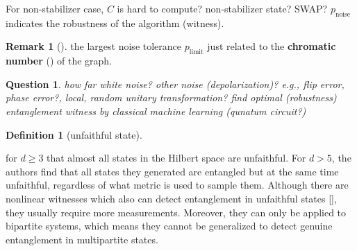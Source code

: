 \documentclass[
aps,
pra,
floatfix,
]{revtex4-2}
\theoremstyle{plain}
\newtheorem{question}{Question}
\theoremstyle{definition}
\newtheorem{definition}{Definition}
\newtheorem{remark}{Remark}
\newcommand{\noise}{\text{noise}}
\newcommand{\dm}{\rho}
\begin{document}
For non-stabilizer case, \cite{zhangEfficientEntanglementGeneration2021} \cite{zhuMachineLearningDerivedEntanglement2021}
$C$ is hard to compute? non-stabilizer state? SWAP?
$p_{\noise}$ indicates the robustness of the algorithm (witness).
\begin{remark}[\cite{zhouDetectingMultipartiteEntanglement2019}]
	the largest noise tolerance $p_{\text{limit}}$ just related to the \textbf{chromatic number} () of the graph.
\end{remark}
\begin{question}
	how far white noise?
	other noise (depolarization)? e.g., flip error, phase error?, local, random unitary transformation?
find optimal (robustness) entanglement witness by classical machine learning (qunatum circuit?)
\end{question}
\cite{weilenmannEntanglementDetectionMeasuring2020}
\begin{definition}[unfaithful state]\label{def:unfaithful_state}
\end{definition}
\cite{zhanDetectingEntanglementUnfaithful2021}
for $d \ge 3$ that almost all states in the Hilbert space are unfaithful. 
For $d > 5$, the authors find that all states they generated are entangled but at the same time unfaithful, regardless of what metric is used to sample them.
Although there are nonlinear witnesses which also can detect entanglement in unfaithful states [], they usually require more measurements.
Moreover, they can only be applied to bipartite systems, which means they cannot be generalized to detect genuine entanglement in multipartite states.
\end{document}
